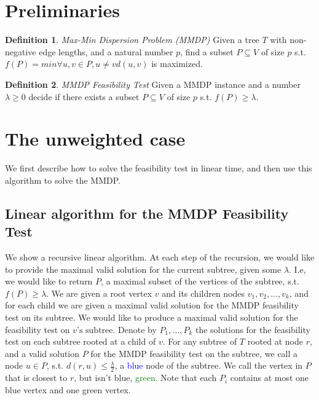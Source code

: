 \documentclass[11pt,a4paper]{article}
\newtheorem{algo}{Algorithm}[section]
\theoremstyle{definition}
\newtheorem{definition}{Definition}
\theoremstyle{remark}
\begin{document}
\section{Preliminaries}
\begin{definition}
\emph{Max-Min Dispersion Problem (MMDP)} Given a tree $T$ with non-negative edge lengths, and a natural number $p$, find a subset $P\subseteq V$ of size $p$ s.t. $f(P)=min{\scriptscriptstyle \forall u,v\in P,u\neq v}d(u,v)$ is maximized.
\end{definition}
\begin{definition}
\emph{MMDP Feasibility Test} Given a MMDP instance and a number $\lambda\geq0$ decide if there exists a subset $P\subseteq V$ of size $p$ s.t. $f(P)\geq\lambda$.
\end{definition}

\section{The unweighted case}
We first describe how to solve the feasibility test in linear time, and then use this algorithm to solve the MMDP.
\subsection{Linear algorithm for the MMDP Feasibility Test}
We show a recursive linear algorithm.
At each step of the recursion, we would like to provide the maximal valid solution for the current subtree, given some $\lambda$. I.e, we would like to return $P$, a maximal subset of the vertices of the subtree, s.t. $f(P)\geq\lambda$.
We are given a root vertex $v$ and its children nodes $v_{1},v_{2},...,v_{k}$, and for each child we are given a maximal valid solution for the MMDP feasibility test on its subtree. We would like to produce a maximal valid solution for the feasibility test on $v\text{'s subtree}$.
Denote by $P_{1},...,P_{k}$ the solutions for the feasibility test on each subtree rooted at a child of $v$.
For any subtree of $T$ rooted at node $r$, and a valid solution $P$ for the MMDP feasibility test on the subtree, we call a node $u\in P$, s.t. $d(r,u)\leq\frac{\lambda}{2}$, a \textcolor{blue}{blue} node of the subtree. We call the vertex in $P$ that is closest to $r$, but isn't blue, \textcolor{green}{green}.
Note that each $P_{i}$ contains at most one blue vertex and one green vertex.
\end{document}
